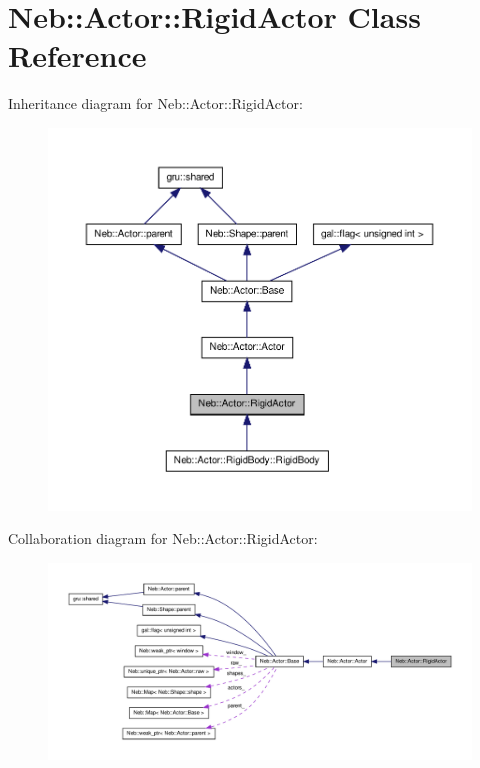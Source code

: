 \hypertarget{classNeb_1_1Actor_1_1RigidActor}{\section{\-Neb\-:\-:\-Actor\-:\-:\-Rigid\-Actor \-Class \-Reference}
\label{classNeb_1_1Actor_1_1RigidActor}
}


\-Inheritance diagram for \-Neb\-:\-:\-Actor\-:\-:\-Rigid\-Actor\-:\nopagebreak
\begin{figure}[H]
\begin{center}
\leavevmode
\includegraphics[width=350pt]{classNeb_1_1Actor_1_1RigidActor__inherit__graph}
\end{center}
\end{figure}


\-Collaboration diagram for \-Neb\-:\-:\-Actor\-:\-:\-Rigid\-Actor\-:\nopagebreak
\begin{figure}[H]
\begin{center}
\leavevmode
\includegraphics[width=350pt]{classNeb_1_1Actor_1_1RigidActor__coll__graph}
\end{center}
\end{figure}
